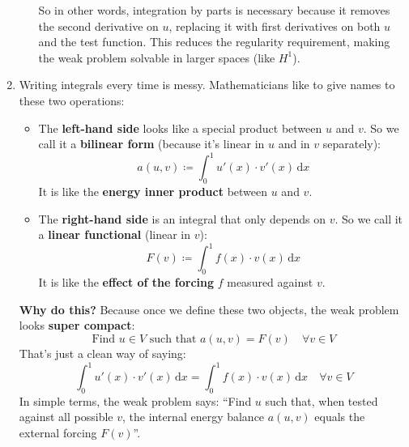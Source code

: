 \begin{enumerate}
\begin{itemize}
        So in other words, integration by parts is necessary because it removes the second derivative on $u$, replacing it with first derivatives on both $u$ and the test function. This reduces the regularity requirement, making the weak problem solvable in larger spaces (like $H^1$).
    \end{itemize}


    \item {} Writing integrals every time is messy. Mathematicians like to give names to these two operations:
    \begin{itemize}
        \item The \textbf{left-hand side} looks like a special product between $u$ and $v$. So we call it a \textbf{bilinear form} (because it's linear in $u$ and in $v$ separately):
        \begin{equation}
            a(u,v) \coloneq \int_0^1 u'(x) \cdot v'(x)\, \mathrm{d}x
        \end{equation}
        It is like the \textbf{energy inner product} between $u$ and $v$.

        \item The \textbf{right-hand side} is an integral that only depends on $v$. So we call it a \textbf{linear functional} (linear in $v$):
        \begin{equation}
            F(v) \coloneq \int_0^1 f(x) \cdot v(x)\, \mathrm{d}x
        \end{equation}
        It is like the \textbf{effect of the forcing} $f$ measured against $v$.
    \end{itemize}
    \textcolor{Green3}{ \textbf{Why do this?}} Because once we define these two objects, the weak problem looks \textbf{super compact}:
    \begin{equation}\label{eq: weak formulation}
        \text{Find } u \in V \text{ such that } a(u,v) = F(v) \quad \forall v \in V
    \end{equation}
    That's just a clean way of saying:
    \begin{equation*}
        \int_0^1 u'(x) \cdot v'(x)\, \mathrm{d}x = \int_0^1 f(x) \cdot v(x)\, \mathrm{d}x \quad \forall v \in V        
    \end{equation*}
    In simple terms, the weak problem says: ``Find $u$ such that, when tested against all possible $v$, the internal energy balance $a(u,v)$ equals the external forcing $F(v)$''.
\end{enumerate}
